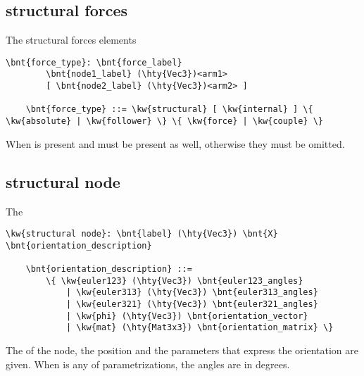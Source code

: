 \subsection{structural forces}
The structural forces elements
\begin{Verbatim}[commandchars=\\\{\}]
    \bnt{force_type}: \bnt{force_label}
        \bnt{node1_label} (\hty{Vec3})<arm1>
        [ \bnt{node2_label} (\hty{Vec3})<arm2> ]

    \bnt{force_type} ::= \kw{structural} [ \kw{internal} ] \{ \kw{absolute} | \kw{follower} \} \{ \kw{force} | \kw{couple} \}
\end{Verbatim}
When  is present  and  must be present
as well, otherwise they must be omitted.

\subsection{structural node}
\label{sec:APP:LOGFILE:STRUCTURAL_NODE}
The 
\begin{Verbatim}[commandchars=\\\{\}]
    \kw{structural node}: \bnt{label} (\hty{Vec3}) \bnt{X} \bnt{orientation_description}

    \bnt{orientation_description} ::=
        \{ \kw{euler123} (\hty{Vec3}) \bnt{euler123_angles}
            | \kw{euler313} (\hty{Vec3}) \bnt{euler313_angles}
            | \kw{euler321} (\hty{Vec3}) \bnt{euler321_angles}
            | \kw{phi} (\hty{Vec3}) \bnt{orientation_vector}
            | \kw{mat} (\hty{Mat3x3}) \bnt{orientation_matrix} \}
\end{Verbatim}
The  of the node, the position 
and the  parameters that express the orientation
are given.
When  is any of  parametrizations,
the angles are in degrees.

